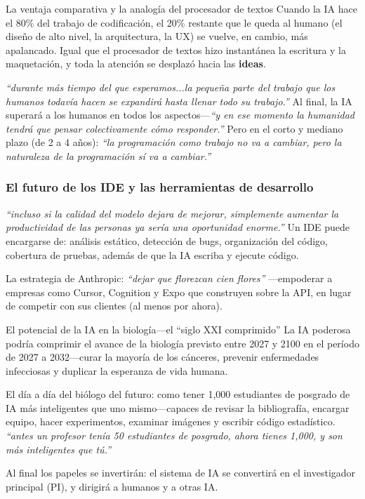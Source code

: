 \documentclass[a4paper]{article}
\begin{document}
\begin{knowledgebox}{La ventaja comparativa y la analogía del procesador de textos}
Cuando la IA hace el 80\% del trabajo de codificación, el 20\% restante que le queda al humano (el diseño de alto nivel, la arquitectura, la UX) se vuelve, en cambio, más apalancado. Igual que el procesador de textos hizo instantánea la escritura y la maquetación, y toda la atención se desplazó hacia las \textbf{ideas}.

\textit{``durante más tiempo del que esperamos...la pequeña parte del trabajo que los humanos todavía hacen se expandirá hasta llenar todo su trabajo.''} Al final, la IA superará a los humanos en todos los aspectos—\textit{``y en ese momento la humanidad tendrá que pensar colectivamente cómo responder.''} Pero en el corto y mediano plazo (de 2 a 4 años): \textit{``la programación como trabajo no va a cambiar, pero la naturaleza de la programación sí va a cambiar.''}
\end{knowledgebox}

\subsubsection{El futuro de los IDE y las herramientas de desarrollo}

\textit{``incluso si la calidad del modelo dejara de mejorar, simplemente aumentar la productividad de las personas ya sería una oportunidad enorme.''} Un IDE puede encargarse de: análisis estático, detección de bugs, organización del código, cobertura de pruebas, además de que la IA escriba y ejecute código.

La estrategia de Anthropic: \textit{``dejar que florezcan cien flores''} —empoderar a empresas como Cursor, Cognition y Expo que construyen sobre la API, en lugar de competir con sus clientes (al menos por ahora).

\begin{importantbox}{El potencial de la IA en la biología—el ``siglo XXI comprimido''}
La IA poderosa podría comprimir el avance de la biología previsto entre 2027 y 2100 en el período de 2027 a 2032—curar la mayoría de los cánceres, prevenir enfermedades infecciosas y duplicar la esperanza de vida humana.

El día a día del biólogo del futuro: como tener 1,000 estudiantes de posgrado de IA más inteligentes que uno mismo—capaces de revisar la bibliografía, encargar equipo, hacer experimentos, examinar imágenes y escribir código estadístico. \textit{``antes un profesor tenía 50 estudiantes de posgrado, ahora tienes 1,000, y son más inteligentes que tú.''}

Al final los papeles se invertirán: el sistema de IA se convertirá en el investigador principal (PI), y dirigirá a humanos y a otras IA.
\end{importantbox}
\end{document}
